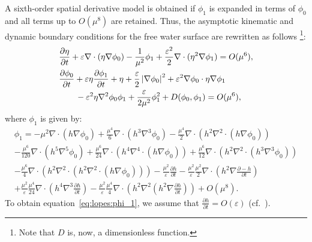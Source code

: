 A sixth-order spatial derivative model is obtained if
$\phi_1$ is expanded in terms of $\phi_0$ and all terms up
to $O(\mu^8)$ are retained.  Thus, the asymptotic kinematic
and dynamic boundary conditions for the free water surface
are rewritten as follows \footnote{Note that $D$
is, now, a  dimensionless function.}:
\begin{subequations}\label{eq:lopes:kindyn}
\begin{align}
&\displaystyle\frac{\partial \eta}{\partial t}+\varepsilon\nabla\cdot(\eta\nabla\phi_0)-\frac{1}{\mu^2}\phi_1+
  \frac{\varepsilon^2}{2}\nabla\cdot(\eta^2\nabla\phi_1)=O(\mu^{6}),
\vspace{0.3cm}\\ &\displaystyle
\frac{\partial \phi_0}{\partial t}+\varepsilon\eta\frac{\partial \phi_1}{\partial t}+\eta +
\frac{\varepsilon}{2}
\left|\nabla\phi_0\right|^2+\varepsilon^2\nabla\phi_0\cdot\eta\nabla\phi_1\nonumber
\\ & \displaystyle \qquad
-\varepsilon^2\eta\nabla^2\phi_0\phi_1
+\frac{\varepsilon}{2\mu^2}\phi_1^2
+D(\phi_0,\phi_1)
=O(\mu^{6}),
\end{align}
\end{subequations}
where $\phi_1$ is given by:
\begin{multline}\label{eq:lopes:phi_1}
\phi_1= -\mu^{2}\nabla\cdot\left(h\nabla\phi_0\right)
+\frac{\mu^{4}}{6}\nabla\cdot\left(h^3\nabla^3\phi_0\right)
-\frac{\mu^{4}}{2}\nabla\cdot\left(h^2
\nabla^2\cdot\left(h\nabla\phi_0\right)
\right)\\
-\frac{\mu^6}{120}\nabla\cdot\left(h^5\nabla^5\phi_0\right)+
\frac{\mu^6}{24}\nabla\cdot\left(h^4\nabla^4\cdot\left(h\nabla\phi_0\right)\right)+\frac{\mu^6}{12}\nabla\cdot\left(h^2\nabla^2\cdot\left(h^3\nabla^3\phi_0\right)\right)\\
-\frac{\mu^6}{4}\nabla\cdot\left(h^2\nabla^2\cdot\left(h^2\nabla^2\cdot\left(h\nabla\phi_0\right)\right)\right)
-\frac{\mu^2}{\varepsilon}\frac{\partial h}{\partial t}-
\frac{\mu^2}{\varepsilon}\frac{\mu^2}{2}\nabla\cdot\left(h^2\nabla\frac{\partial
-h}{\partial t}\right)\\
+\frac{\mu^2}{\varepsilon}\frac{\mu^4}{24}\nabla\cdot\left(h^4\nabla^3
\frac{\partial h}{\partial t}\right)
-\frac{\mu^2}{\varepsilon}\frac{\mu^4}{4}\nabla\cdot\left(h^2\nabla^2\left(h^2\nabla\frac{\partial h}{\partial t}\right)\right)+O(\mu^{8}).
\end{multline}
To obtain equation~\eqref{eq:lopes:phi_1}, we assume that
$\displaystyle\frac{\partial h}{\partial t}=O(\varepsilon)$
(cf.~\cite{DutykhDias2007}).

